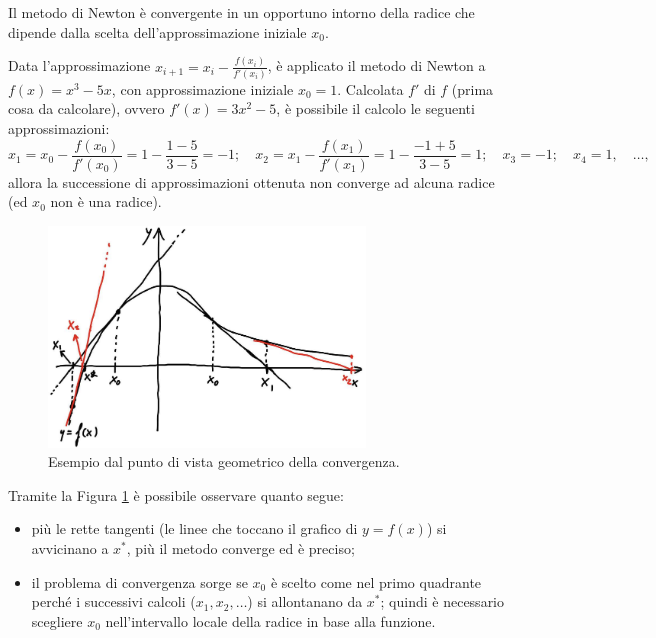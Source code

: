 Il metodo di Newton è convergente in un opportuno intorno della radice che dipende dalla scelta dell'approssimazione iniziale $x_0$.
\begin{example} 
	Data l'approssimazione $x_{i+1}=x_i-\frac{f(x_i)}{f'(x_i)}$, è applicato il metodo di Newton a $f(x)=x^3-5x$, con approssimazione iniziale $x_0=1$. Calcolata $f'$ di $f$ (prima cosa da calcolare), ovvero $f'(x)=3x^2-5$, è possibile il calcolo le seguenti approssimazioni:
	\begin{equation*}
		x_1=x_0-\frac{f(x_0)}{f'(x_0)}=1-\frac{1-5}{3-5}=-1;\quad x_2=x_1-\frac{f(x_1)}{f'(x_1)}=1-\frac{-1+5}{3-5}=1;\quad x_3=-1;\quad x_4=1,\quad\hdots,
	\end{equation*}
	allora la successione di approssimazioni ottenuta non converge ad alcuna radice (ed $x_0$ non è una radice).
\end{example}

\begin{figure}
	\centering
	\includegraphics[width=0.75\textwidth]{immagini/EsemGeoConv.png}
	\caption{\label{fig:esempio_geometrico_convergenza}Esempio dal punto di vista geometrico della convergenza.}
\end{figure}

Tramite la Figura \ref{fig:esempio_geometrico_convergenza} è possibile osservare quanto segue: \begin{itemize}
	\item più le rette tangenti (le linee che toccano il grafico di $y=f(x)$) si avvicinano a $x^*$, più  il metodo converge ed è preciso;
	\item il problema di convergenza sorge se $x_0$ è scelto come nel primo quadrante perché i successivi calcoli ($x_1, x_2, \hdots$) si allontanano da $x^*$; quindi è necessario scegliere $x_0$ nell'intervallo locale della radice in base alla funzione.
\end{itemize}

